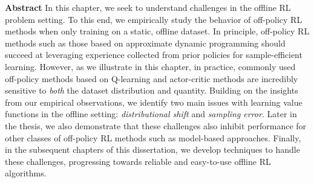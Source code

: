 \documentclass[../thesis.tex]{subfiles}
\begin{document}
\vspace{-0.4cm}
\begin{AIbox}{\large{\textbf{Abstract}}}
\vspace{4mm}
In this chapter, we seek to understand challenges in the offline RL problem setting. To this end, we empirically study the behavior of off-policy RL methods when only training on a static, offline dataset. In principle, off-policy RL methods such as those based on approximate dynamic programming should succeed at leveraging experience collected from prior policies for sample-efficient learning. However, as we illustrate in this chapter, in practice, commonly used off-policy methods based on Q-learning and actor-critic methods are incredibly sensitive to \emph{both} the dataset distribution and quantity. Building on the insights from our empirical observations, we identify two main issues with learning value functions in the offline setting: \emph{distributional shift} and \emph{sampling error}. Later in the thesis, we also demonstrate that these challenges also inhibit performance for other classes of off-policy RL methods such as model-based approaches. Finally, in the subsequent chapters of this dissertation, we develop techniques to handle these challenges, progressing towards reliable and easy-to-use offline RL algorithms. 

\end{AIbox}
\end{document}
